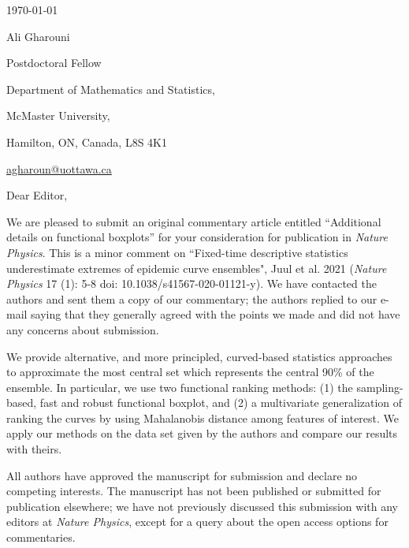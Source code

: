 \documentclass[12pt,letterpaper]{letter}
\newcommand{\journalname}{\emph{Nature Physics}\xspace}
\begin{document}
\begin{multicols}{2}
\footnotesize
\begin{flushleft}

% 

\vfill

{\normalsize \mydate
\today}
\end{flushleft}

\columnbreak

\begin{flushright}
Ali Gharouni

Postdoctoral Fellow 

Department of Mathematics and Statistics,

McMaster University,

Hamilton, ON, Canada, L8S 4K1

\href{mailto:agharoun@uottawa.ca}{agharoun@uottawa.ca}
\end{flushright}

\end{multicols}

\setlength{\parskip}{1em}
\thispagestyle{empty}

\vspace{-1em}

Dear Editor,

We are pleased to submit an original commentary article entitled ``Additional details on functional boxplots'' for your consideration for publication in \journalname{}. This is a minor comment on ``Fixed-time descriptive statistics underestimate extremes of epidemic curve ensembles", Juul et al. 2021 (\journalname{} 17 (1): 5-8 doi: 10.1038/s41567-020-01121-y). We have contacted the authors and sent them a copy of our commentary; the authors replied to our e-mail saying that they generally agreed with the points we made and did not have any concerns about submission.

We provide alternative, and more principled, curved-based statistics approaches to approximate the most central set which represents the central 90\% of the ensemble. In particular, we use two functional ranking methods: (1) the sampling-based, fast and robust functional boxplot, and (2) a multivariate generalization of ranking the curves by using Mahalanobis distance among features of interest. We apply our methods on the data set given by the authors and compare our results with theirs.

All authors have approved the manuscript for submission and declare no competing interests. The manuscript has not been published or submitted for publication elsewhere; we have not previously discussed this submission with any editors at \journalname{}, except for a query about the open access options for commentaries.
\end{document}
